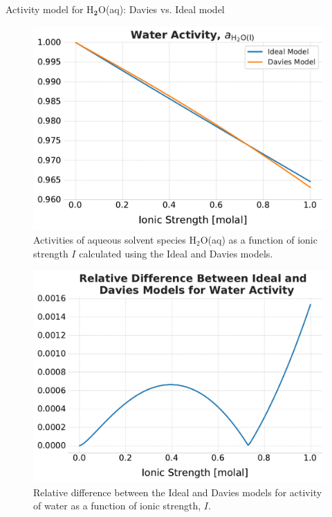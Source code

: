\begin{frame}{Activity model for H$_{\boldsymbol{2}}$O(aq): Davies vs. Ideal model}
%
 \lcol
\begin{figure}
\centering
\includegraphics[height=0.73\columnwidth]{figures/activity-models/activity-water-davies-vs-ideal}
\caption{Activities of aqueous solvent species H$_{2}$O(aq) as a function of
ionic strength $I$ calculated using the Ideal and Davies models.}
\end{figure}
\rcol

\begin{figure}
\centering
\includegraphics[height=0.73\columnwidth]{figures/activity-models/activity-water-davies-vs-ideal-diff}
\caption{Relative difference between the Ideal and Davies models for activity
of water as a function of ionic strength, $I$.}
\end{figure}
\ecol

\end{frame}
%
